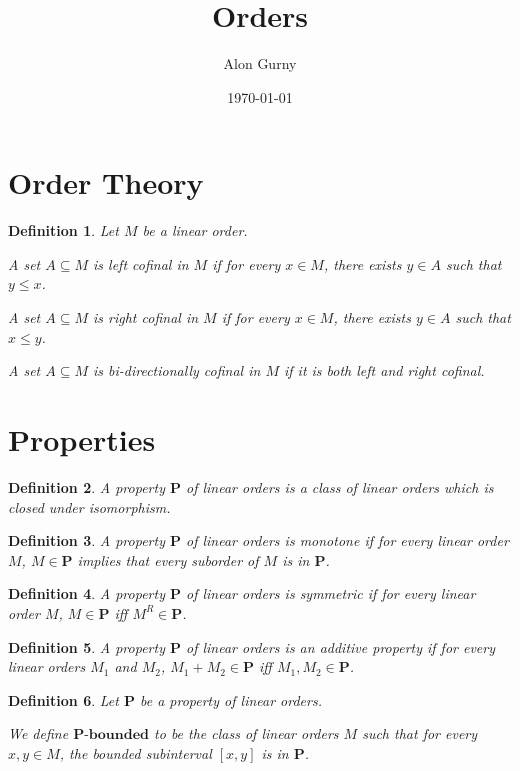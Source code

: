 \documentclass{article}
\author{Alon Gurny}
\title{Orders}
\date{\today}
\newtheorem{definition}{Definition}
\newcommand{\bounded}[1]{{#1} \text{-} \mathbf{bounded}}
\newcommand{\pp}{\mathbf{P}}
\begin{document}
\maketitle

\section{Order Theory}
\begin{definition}
  Let $M$ be a linear order.

  A set $A \subseteq M$ is \emph{left cofinal} in $M$ if for every $x \in M$,
  there exists $y \in A$ such that $y \le x$.

  A set $A \subseteq M$ is \emph{right cofinal} in $M$ if for every $x \in M$,
  there exists $y \in A$ such that $x \le y$.

  A set $A \subseteq M$ is \emph{bi-directionally cofinal} in $M$ if it is both left and right cofinal.
\end{definition}

\section{Properties}
\begin{definition}
  A \emph{property} $\pp$ of linear orders is a class of linear orders which
  is closed under isomorphism.
\end{definition}

\begin{definition}
  A property $\pp$ of linear orders is \emph{monotone} if for every linear order $M$,
  $M \in \pp$ implies that every suborder of $M$ is in $\pp$.
\end{definition}

\begin{definition}
  A property $\pp$ of linear orders is \emph{symmetric} if for every linear order $M$,
  $M \in \pp$ iff $M^R \in \pp$.
\end{definition}

\begin{definition}
  A property $\pp$ of linear orders is an \emph{additive property} if for every linear orders $M_1$ and $M_2$,
  $M_1 + M_2 \in \pp$ iff $M_1, M_2 \in \pp$.
\end{definition}

\begin{definition}
  Let $\pp$ be a property of linear orders.

  We define $\bounded{\pp}$ to be the class of linear orders $M$ such that for every $x, y \in M$,
  the bounded subinterval $[x, y]$ is in $\pp$.
\end{definition}
\end{document}
